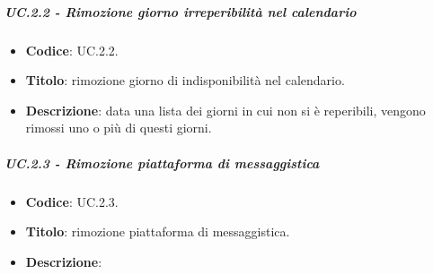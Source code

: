			
	\subparagraph{UC\theuccount.2.2 - Rimozione giorno irreperibilità nel calendario}
	\begin{itemize}
		\item \textbf{Codice}: UC\theuccount.2.2.
		\item \textbf{Titolo}: rimozione giorno di indisponibilità nel calendario.
		\item \textbf{Descrizione}: data una lista dei giorni in cui non si è reperibili, vengono rimossi uno o più di questi giorni.
	\end{itemize}
			
			
	\subparagraph{UC\theuccount.2.3 - Rimozione piattaforma di messaggistica}
	\begin{itemize}
		\item \textbf{Codice}: UC\theuccount.2.3.
		\item \textbf{Titolo}: rimozione piattaforma di messaggistica.
		\item \textbf{Descrizione}: 
	\end{itemize}


		
